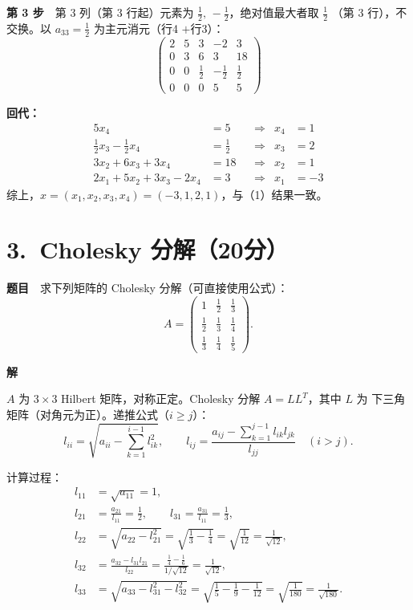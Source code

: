 \documentclass[a4paper,11pt]{ctexart}
\begin{document}
\textbf{第 3 步}　第 3 列（第 3 行起）元素为 $\tfrac12,\,-\tfrac12$，绝对值最大者取 $\tfrac12$
（第 3 行），不交换。以 $a_{33}=\tfrac12$ 为主元消元（行4 $+$行3）：
\[
  \left(\begin{array}{rrrr|r}
    2 & 5 & 3 & -2 & 3\\
    0 & 3 & 6 & 3 & 18\\
    0 & 0 & \tfrac12 & -\tfrac12 & \tfrac12\\
    0 & 0 & 0 & 5 & 5
  \end{array}\right)
\]

\textbf{回代：}
\[
  \begin{aligned}
    5x_4&=5 & &\Rightarrow & x_4&=1\\
    \tfrac12 x_3-\tfrac12 x_4&=\tfrac12 & &\Rightarrow & x_3&=2\\
    3x_2+6x_3+3x_4&=18 & &\Rightarrow & x_2&=1\\
    2x_1+5x_2+3x_3-2x_4&=3 & &\Rightarrow & x_1&=-3
  \end{aligned}
\]
综上，$x=(x_1,x_2,x_3,x_4)=(-3,1,2,1)$，与（1）结果一致。

\section*{3.\ Cholesky 分解（20分）}

\textbf{题目}　求下列矩阵的 Cholesky 分解（可直接使用公式）：
\[
  A=\begin{pmatrix}
    1 & \tfrac12 & \tfrac13\\
    \tfrac12 & \tfrac13 & \tfrac14\\
    \tfrac13 & \tfrac14 & \tfrac15
  \end{pmatrix}.
\]

\textbf{解}

$A$ 为 $3\times3$ Hilbert 矩阵，对称正定。Cholesky 分解 $A=LL^{T}$，其中 $L$ 为
下三角矩阵（对角元为正）。递推公式（$i\ge j$）：
\[
  l_{ii}=\sqrt{a_{ii}-\sum_{k=1}^{i-1}l_{ik}^{2}},
  \qquad
  l_{ij}=\frac{a_{ij}-\sum_{k=1}^{j-1}l_{ik}l_{jk}}{l_{jj}}\quad(i>j).
\]

计算过程：
\[
  \begin{aligned}
    l_{11}&=\sqrt{a_{11}}=1,\\
    l_{21}&=\frac{a_{21}}{l_{11}}=\frac12,\qquad
    l_{31}=\frac{a_{31}}{l_{11}}=\frac13,\\
    l_{22}&=\sqrt{a_{22}-l_{21}^{2}}=\sqrt{\tfrac13-\tfrac14}=\sqrt{\tfrac{1}{12}}=\frac{1}{\sqrt{12}},\\
    l_{32}&=\frac{a_{32}-l_{31}l_{21}}{l_{22}}
          =\frac{\tfrac14-\tfrac16}{1/\sqrt{12}}=\frac{1}{\sqrt{12}},\\
    l_{33}&=\sqrt{a_{33}-l_{31}^{2}-l_{32}^{2}}
          =\sqrt{\tfrac15-\tfrac19-\tfrac{1}{12}}
          =\sqrt{\tfrac{1}{180}}=\frac{1}{\sqrt{180}}.
  \end{aligned}
\]
\end{document}
